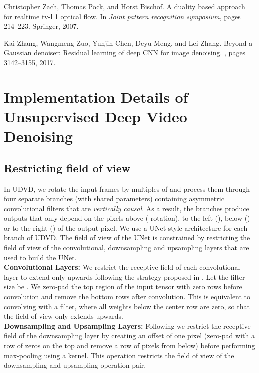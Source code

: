 \documentclass[final]{cvpr}
\begin{document}
{\begin{thebibliography}{10}
Christopher Zach, Thomas Pock, and Horst Bischof.
\newblock A duality based approach for realtime tv-l 1 optical flow.
\newblock In {\em Joint pattern recognition symposium}, pages 214--223.
  Springer, 2007.

Kai Zhang, Wangmeng Zuo, Yunjin Chen, Deyu Meng, and Lei Zhang.
\newblock Beyond a {Gaussian} denoiser: Residual learning of deep {CNN} for
  image denoising.
, pages 3142--3155, 2017.

\end{thebibliography}
}

\appendix
\onecolumn

\section{Implementation Details of Unsupervised Deep Video Denoising}



\subsection{Restricting field of view}
\label{sec:blind-spot-layers}

In UDVD, we rotate the input frames by multiples of  and process them through four separate branches (with shared parameters) containing asymmetric convolutional filters that are \emph{vertically causal}. As a result, the branches produce outputs that only depend on the pixels above ( rotation), to the left (), below () or to the right () of the output pixel. We use a UNet \cite{ronneberger2015u} style architecture for each branch of UDVD. The field of view of the UNet is constrained by restricting the field of view of the convolutional, downsampling and upsampling layers that are used to build the UNet. \\
 
 
\noindent \textbf{Convolutional Layers:} We restrict the receptive field of each convolutional layer to extend only upwards following the strategy proposed in \cite{blindspotnet}. Let the filter size be . We zero-pad the top region of the input tensor with  zero rows before convolution and remove the bottom  rows after convolution. This is equivalent to convolving with a filter, where all weights below the center row are zero, so that the field of view only extends upwards. \\

\noindent \textbf{Downsampling and Upsampling Layers:} Following \cite{blindspotnet} we restrict the receptive field of the downsampling layer by creating an offset of one pixel (zero-pad with a row of zeros on the top and remove a row of pixels from below) before performing max-pooling using a  kernel. This operation restricts the field of view of the downsampling and upsampling operation pair. 
\end{document}
